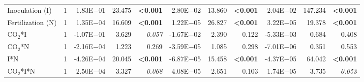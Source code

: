 \begin{landscape}
\begin{table}
{\begin{tabular}{p{3cm}p{0.5cm}p{1.75cm}p{1.5cm}p{1.5cm}p{1.75cm}p{1.5cm}p{1.5cm}p{1.75cm}p{1.5cm}p{1.5cm}}
            Inoculation (I) & \multicolumn{1}{r}{1}
            & \multicolumn{1}{r}{1.83E$-$01}      & \multicolumn{1}{r}{23.475}        & \multicolumn{1}{r}{\textbf{<0.001}}
            & \multicolumn{1}{r}{2.80E$-$02}      & \multicolumn{1}{r}{13.860}        & \multicolumn{1}{r}{\textbf{<0.001}}
            & \multicolumn{1}{r}{2.04E$-$02}      & \multicolumn{1}{r}{147.234}       & \multicolumn{1}{r}{\textbf{<0.001}} 
            \\

            Fertilization (N) & \multicolumn{1}{r}{1}
            & \multicolumn{1}{r}{1.35E$-$04}      & \multicolumn{1}{r}{16.609}        & \multicolumn{1}{r}{\textbf{<0.001}}
            & \multicolumn{1}{r}{1.22E$-$05}      & \multicolumn{1}{r}{26.827}        & \multicolumn{1}{r}{\textbf{<0.001}}
            & \multicolumn{1}{r}{3.22E$-$05}      & \multicolumn{1}{r}{19.378}        & \multicolumn{1}{r}{\textbf{<0.001}} 
            \\

            CO$_2$*I & \multicolumn{1}{r}{1}
            & \multicolumn{1}{r}{-1.07E$-$01}     & \multicolumn{1}{r}{3.629}         & \multicolumn{1}{r}{\textit{0.057}}
            & \multicolumn{1}{r}{-1.67E$-$02}     & \multicolumn{1}{r}{2.390}         & \multicolumn{1}{r}{0.122}
            & \multicolumn{1}{r}{-5.33E$-$03}     & \multicolumn{1}{r}{0.684}         & \multicolumn{1}{r}{0.408} 
            \\

            CO$_2$*N & \multicolumn{1}{r}{1}
            & \multicolumn{1}{r}{-2.16E$-$04}     & \multicolumn{1}{r}{1.223}         & \multicolumn{1}{r}{0.269}
            & \multicolumn{1}{r}{-3.59E$-$05}     & \multicolumn{1}{r}{1.085}         & \multicolumn{1}{r}{0.298}
            & \multicolumn{1}{r}{-7.01E$-$06}     & \multicolumn{1}{r}{0.351}         & \multicolumn{1}{r}{0.553} 
            \\

            I*N & \multicolumn{1}{r}{1}
            & \multicolumn{1}{r}{-4.26E$-$04}     & \multicolumn{1}{r}{20.045}        & \multicolumn{1}{r}{\textbf{<0.001}}
            & \multicolumn{1}{r}{-6.87E$-$05}     & \multicolumn{1}{r}{15.458}        & \multicolumn{1}{r}{\textbf{<0.001}}
            & \multicolumn{1}{r}{-4.37E$-$05}     & \multicolumn{1}{r}{64.042}        & \multicolumn{1}{r}{\textbf{<0.001}} 
            \\

            CO$_2$*I*N & \multicolumn{1}{r}{1}
            & \multicolumn{1}{r}{2.50E$-$04}      & \multicolumn{1}{r}{3.327}         & \multicolumn{1}{r}{\textit{0.068}}
            & \multicolumn{1}{r}{4.08E$-$05}      & \multicolumn{1}{r}{2.651}         & \multicolumn{1}{r}{0.103}
            & \multicolumn{1}{r}{1.74E$-$05}      & \multicolumn{1}{r}{3.735}         & \multicolumn{1}{r}{\textit{0.053}} 
            \\
            \hline


\end{tabular}}
\end{table}
\end{landscape}

